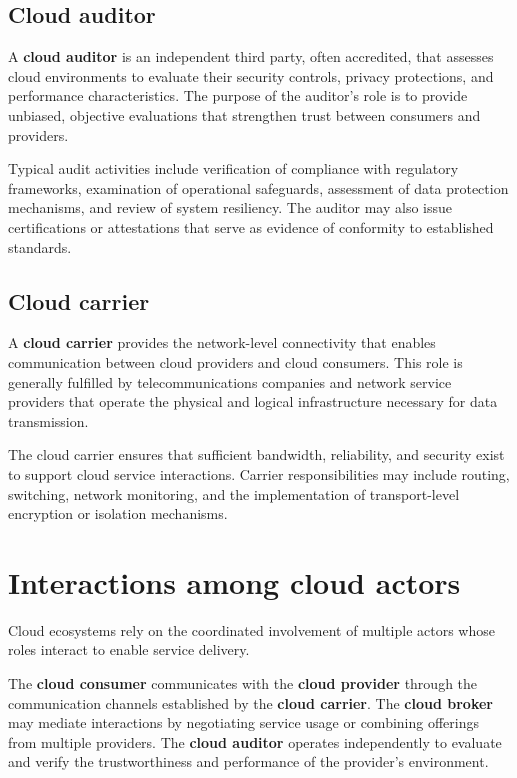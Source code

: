 \documentclass[11pt,a4paper,openany]{report}
\begin{document}
\subsection{Cloud auditor}

A \textbf{cloud auditor} is an independent third party, often accredited, that assesses cloud environments to evaluate their security controls, privacy protections, and performance characteristics. The purpose of the auditor's role is to provide unbiased, objective evaluations that strengthen trust between consumers and providers.

Typical audit activities include verification of compliance with regulatory frameworks, examination of operational safeguards, assessment of data protection mechanisms, and review of system resiliency. The auditor may also issue certifications or attestations that serve as evidence of conformity to established standards.

\subsection{Cloud carrier}

A \textbf{cloud carrier} provides the network-level connectivity that enables communication between cloud providers and cloud consumers. This role is generally fulfilled by telecommunications companies and network service providers that operate the physical and logical infrastructure necessary for data transmission.

The cloud carrier ensures that sufficient bandwidth, reliability, and security exist to support cloud service interactions. Carrier responsibilities may include routing, switching, network monitoring, and the implementation of transport-level encryption or isolation mechanisms.

\section{Interactions among cloud actors}

Cloud ecosystems rely on the coordinated involvement of multiple actors whose roles interact to enable service delivery.

The \textbf{cloud consumer} communicates with the \textbf{cloud provider} through the communication channels established by the \textbf{cloud carrier}. The \textbf{cloud broker} may mediate interactions by negotiating service usage or combining offerings from multiple providers. The \textbf{cloud auditor} operates independently to evaluate and verify the trustworthiness and performance of the provider's environment.
\end{document}
